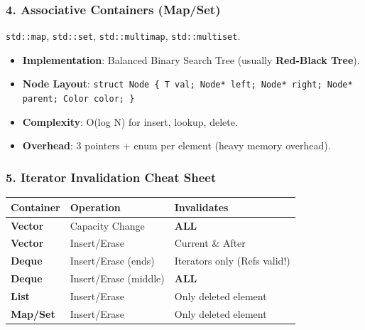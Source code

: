 \hypertarget{associative-containers-mapset}{%
\subsubsection{4. Associative Containers
(Map/Set)}\label{associative-containers-mapset}}

\passthrough{\lstinline!std::map!}, \passthrough{\lstinline!std::set!},
\passthrough{\lstinline!std::multimap!},
\passthrough{\lstinline!std::multiset!}.

\begin{itemize}
\tightlist
\item
  \textbf{Implementation}: Balanced Binary Search Tree (usually
  \textbf{Red-Black Tree}).
\item
  \textbf{Node Layout}:
  \passthrough{\lstinline!struct Node \{ T val; Node* left; Node* right; Node* parent; Color color; \}!}
\item
  \textbf{Complexity}: O(log N) for insert, lookup, delete.
\item
  \textbf{Overhead}: 3 pointers + enum per element (heavy memory
  overhead).
\end{itemize}

\hypertarget{iterator-invalidation-cheat-sheet}{%
\subsubsection{5. Iterator Invalidation Cheat
Sheet}\label{iterator-invalidation-cheat-sheet}}

\begin{longtable}[]{@{}lll@{}}
\toprule
Container & Operation & Invalidates \\
\midrule
\endhead
\textbf{Vector} & Capacity Change & \textbf{ALL} \\
\textbf{Vector} & Insert/Erase & Current \& After \\
\textbf{Deque} & Insert/Erase (ends) & Iterators only (Refs valid!) \\
\textbf{Deque} & Insert/Erase (middle) & \textbf{ALL} \\
\textbf{List} & Insert/Erase & Only deleted element \\
\textbf{Map/Set} & Insert/Erase & Only deleted element \\
\bottomrule
\end{longtable}
